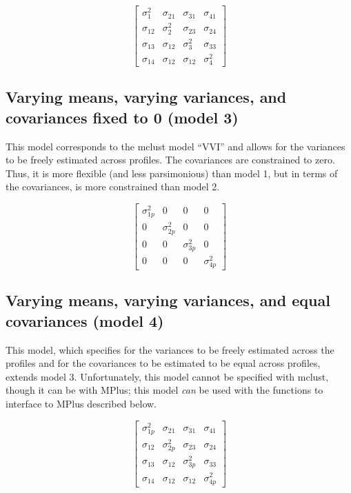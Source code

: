 \documentclass[]{book}
\theoremstyle{definition}
\theoremstyle{definition}
\theoremstyle{definition}
\theoremstyle{remark}
\begin{document}
\[
\left[ \begin{matrix} { \sigma }_{ 1 }^{ 2 } & { \sigma }_{ 21 } & { \sigma }_{ 31 } & { \sigma }_{ 41 } \\ { \sigma }_{ 12 } & { \sigma }_{ 2 }^{ 2 } & { \sigma }_{ 23 } & { \sigma }_{ 24 } \\ { \sigma }_{ 13 } & { \sigma }_{ 12 } & { \sigma }_{ 3 }^{ 2 } & { \sigma }_{ 33 } \\ { \sigma }_{ 14 } & { \sigma }_{ 12 } & { \sigma }_{ 12 } & { \sigma }_{ 4 }^{ 2 } \end{matrix} \right] 
\]

\subsection{Varying means, varying variances, and covariances fixed to 0
(model
3)}\label{varying-means-varying-variances-and-covariances-fixed-to-0-model-3}

This model corresponds to the mclust model ``VVI'' and allows for the
variances to be freely estimated across profiles. The covariances are
constrained to zero. Thus, it is more flexible (and less parsimonious)
than model 1, but in terms of the covariances, is more constrained than
model 2.

\[ 
\left[ \begin{matrix} { \sigma }_{ 1p }^{ 2 } & 0 & 0 & 0 \\ 0 & { \sigma }_{ 2p }^{ 2 } & 0 & 0 \\ 0 & 0 & { \sigma }_{ 3p }^{ 2 } & 0 \\ 0 & 0 & 0 & { \sigma }_{ 4p }^{ 2 } \end{matrix} \right] 
\]

\subsection{Varying means, varying variances, and equal covariances
(model
4)}\label{varying-means-varying-variances-and-equal-covariances-model-4}

This model, which specifies for the variances to be freely estimated
across the profiles and for the covariances to be estimated to be equal
across profiles, extends model 3. Unfortunately, this model cannot be
specified with mclust, though it can be with MPlus; this model
\emph{can} be used with the functions to interface to MPlus described
below.

\[
\left[ \begin{matrix} { \sigma }_{ 1p }^{ 2 } & { \sigma }_{ 21 } & { \sigma }_{ 31 } & { \sigma }_{ 41 } \\ { \sigma }_{ 12 } & { \sigma }_{ 2p }^{ 2 } & { \sigma }_{ 23 } & { \sigma }_{ 24 } \\ { \sigma }_{ 13 } & { \sigma }_{ 12 } & { \sigma }_{ 3p }^{ 2 } & { \sigma }_{ 33 } \\ { \sigma }_{ 14 } & { \sigma }_{ 12 } & { \sigma }_{ 12 } & { \sigma }_{ 4p }^{ 2 } \end{matrix} \right] 
\]
\end{document}
